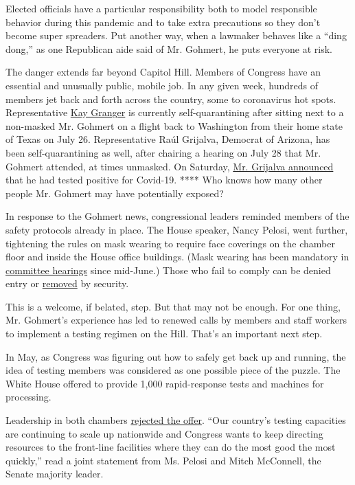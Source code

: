 Elected officials have a particular responsibility both to model
responsible behavior during this pandemic and to take extra precautions
so they don't become super spreaders. Put another way, when a lawmaker
behaves like a ``ding dong,'' as one Republican aide said of Mr.
Gohmert, he puts everyone at risk.

The danger extends far beyond Capitol Hill. Members of Congress have an
essential and unusually public, mobile job. In any given week, hundreds
of members jet back and forth across the country, some to coronavirus
hot spots. Representative
\href{https://thehill.com/homenews/house/509647-texas-rep-kay-granger-self-quarantining-after-sitting-next-to-gohmert-on}{Kay
Granger} is currently self-quarantining after sitting next to a
non-masked Mr. Gohmert on a flight back to Washington from their home
state of Texas on July 26. Representative Raúl Grijalva, Democrat of
Arizona, has been self-quarantining as well, after chairing a hearing on
July 28 that Mr. Gohmert attended, at times unmasked. On Saturday,
\href{https://twitter.com/RepRaulGrijalva/status/1289637013394583553}{Mr.
Grijalva announced} that he had tested positive for Covid-19. **** Who
knows how many other people Mr. Gohmert may have potentially exposed?

In response to the Gohmert news, congressional leaders reminded members
of the safety protocols already in place. The House speaker, Nancy
Pelosi, went further, tightening the rules on mask wearing to require
face coverings on the chamber floor and inside the House office
buildings. (Mask wearing has been mandatory in
\href{https://www.rollcall.com/2020/06/17/face-masks-required-in-house-committee-hearings-congressional-physician-says/}{committee
hearings} since mid-June.) Those who fail to comply can be denied entry
or
\href{https://www.cnn.com/2020/07/29/politics/pelosi-mask-mandate-capitol/index.html}{removed}
by security.

This is a welcome, if belated, step. But that may not be enough. For one
thing, Mr. Gohmert's experience has led to renewed calls by members and
staff workers to implement a testing regimen on the Hill. That's an
important next step.

In May, as Congress was figuring out how to safely get back up and
running, the idea of testing members was considered as one possible
piece of the puzzle. The White House offered to provide 1,000
rapid-response tests and machines for processing.

Leadership in both chambers
\href{https://www.speaker.gov/newsroom/5220}{rejected the offer}. ``Our
country's testing capacities are continuing to scale up nationwide and
Congress wants to keep directing resources to the front-line facilities
where they can do the most good the most quickly,'' read a joint
statement from Ms. Pelosi and Mitch McConnell, the Senate majority
leader.

